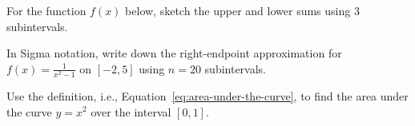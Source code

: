 \documentclass[../main.tex]{subfiles}
\begin{document}
  \begin{example}
    For the function \(f(x)\) below, sketch the upper and lower sums using \(3\) subintervals.

    \hfill{}
    
    \hfill{}
    
    \hfill{}

  \end{example}

  \begin{example}
    In Sigma notation, write down the right-endpoint approximation for \(f(x) = \frac{1}{x^{2} - 1}\) on \([-2, 5]\) using \(n = 20\) subintervals.
  \end{example}
  \clearpage

  \begin{example}
    Use the definition, i.e., Equation~\eqref{eq:area-under-the-curve}, to find the area under the curve \(y = x^{2}\) over the interval \([0,1]\).

  \end{example}
\end{document}
